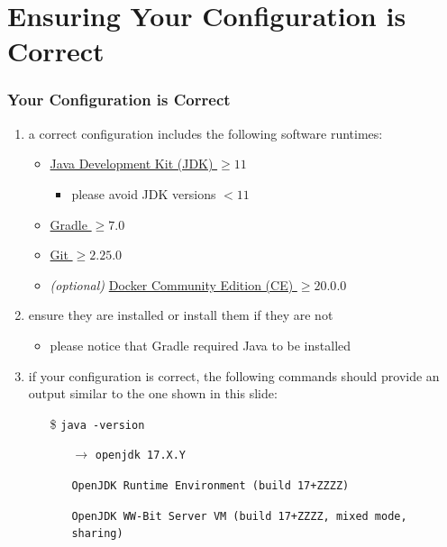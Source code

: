 \documentclass[handout]{beamer}\mode<presentation>{\usetheme{AMSBolognaFC}}
\begin{document}
\section{Ensuring Your Configuration is Correct}

\begin{frame}[c,allowframebreaks]
\frametitle{Your Configuration is Correct}

	\begin{enumerate}

    \item a correct configuration includes the following software runtimes:
    \begin{itemize}
        \item \href{https://www.oracle.com/java/technologies/downloads/}{Java Development Kit (JDK) $\geq 11$}
		\begin{itemize}
			\item \alert{please avoid JDK versions $< 11$}
		\end{itemize}
        \item \href{https://gradle.org/releases}{Gradle $\geq 7.0$}
        \item \href{https://git-scm.com}{Git $\geq 2.25.0$}
    	\item \emph{(optional)} \href{https://www.docker.com/products/docker-desktop}{Docker Community Edition (CE) $\geq 20.0.0$}
    \end{itemize}

	\item ensure they are installed or install them if they are not
	\begin{itemize}
		\item please notice that Gradle required Java to be installed
	\end{itemize}

    \framebreak

    \item if your configuration is correct, the following commands should provide an output similar to the one shown in this slide:
    \begin{itemize}
        \item[\$] \texttt{java -version}
        \begin{itemize}
            \item[$\rightarrow$] \texttt{openjdk 17.X.Y}
            \item[] \texttt{OpenJDK Runtime Environment (build 17+ZZZZ)}
            \item[] \texttt{OpenJDK WW-Bit Server VM (build 17+ZZZZ, mixed mode, sharing)}
        \end{itemize}


\end{itemize}
\end{enumerate}
\end{frame}
\end{document}
